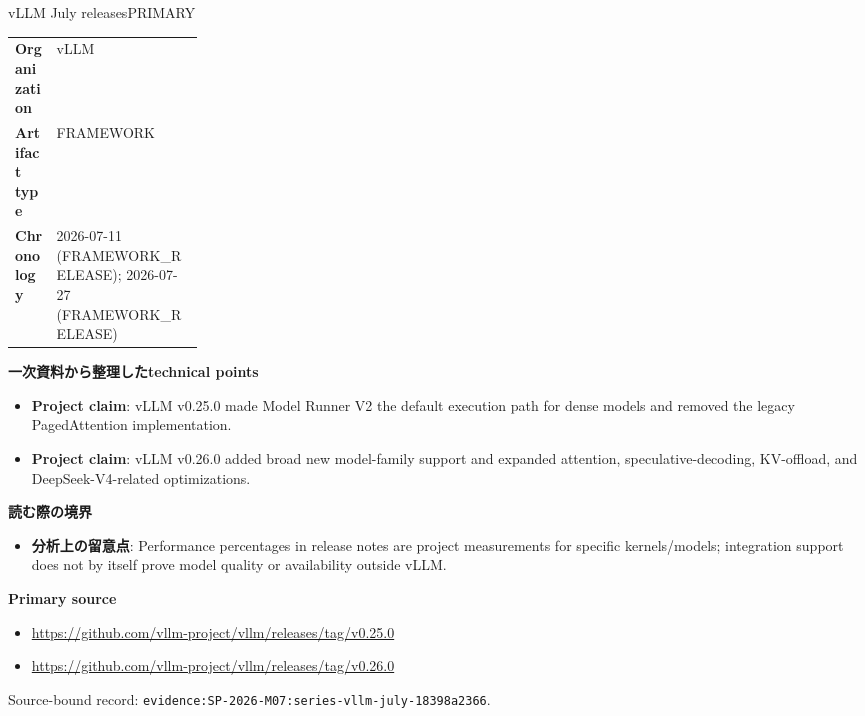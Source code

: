 \begin{technicalnote}{vLLM July releases}{PRIMARY}
\begin{tabularx}{\linewidth}{@{}>{\bfseries}p{0.22\linewidth}X@{}}
Organization & vLLM \\
Artifact type & FRAMEWORK \\
Chronology & 2026-07-11 (FRAMEWORK\_RELEASE); 2026-07-27 (FRAMEWORK\_RELEASE) \\
\end{tabularx}
\smallskip
{\bfseries 一次資料から整理したtechnical points}
\begin{itemize}[leftmargin=1.5em,itemsep=0.35em]
\item \textbf{Project claim}: vLLM v0.25.0 made Model Runner V2 the default execution path for dense models and removed the legacy PagedAttention implementation.
\item \textbf{Project claim}: vLLM v0.26.0 added broad new model-family support and expanded attention, speculative-decoding, KV-offload, and DeepSeek-V4-related optimizations.
\end{itemize}
{\bfseries 読む際の境界}
\begin{itemize}[leftmargin=1.5em,itemsep=0.35em]
\item \textbf{分析上の留意点}: Performance percentages in release notes are project measurements for specific kernels/models; integration support does not by itself prove model quality or availability outside vLLM.
\end{itemize}
{\bfseries Primary source}
\begingroup\sloppy
\begin{itemize}[leftmargin=1.5em,itemsep=0.25em]
\item {\scriptsize\url{https://github.com/vllm-project/vllm/releases/tag/v0.25.0}}
\item {\scriptsize\url{https://github.com/vllm-project/vllm/releases/tag/v0.26.0}}
\end{itemize}
\endgroup
{\scriptsize\color{SurveyMuted}Source-bound record: \texttt{evidence:SP-2026-M07:series-vllm-july-18398a2366}.}
\end{technicalnote}
\medskip

